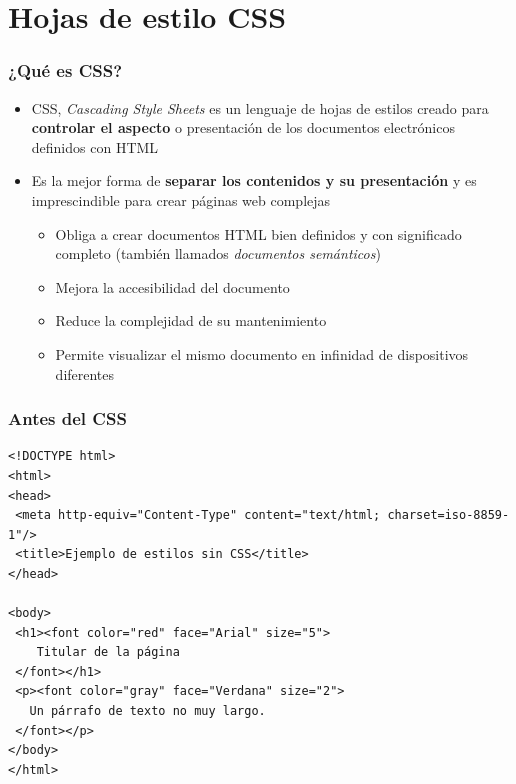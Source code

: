 \documentclass[ucs]{beamer}
\begin{document}




\section{Hojas de estilo CSS}



\begin{frame}
\frametitle{¿Qué es CSS?}

\begin{itemize}
  \item CSS, \emph{Cascading Style Sheets} es un lenguaje de hojas de estilos creado para {\bf controlar el aspecto} o presentación de los documentos electrónicos definidos con HTML
  \item Es la mejor forma de {\bf separar los contenidos y su presentación} y es imprescindible para crear páginas web complejas
  \begin{itemize}
    \item Obliga a crear documentos HTML bien definidos y con significado completo (también llamados \emph{documentos semánticos})
    \item Mejora la accesibilidad del documento
    \item Reduce la complejidad de su mantenimiento
    \item Permite visualizar el mismo documento en infinidad de dispositivos diferentes
  \end{itemize}
\end{itemize}

\end{frame}


\begin{frame}[fragile]
\frametitle{Antes del CSS}

{\footnotesize
\begin{verbatim}
<!DOCTYPE html>
<html>
<head>
 <meta http-equiv="Content-Type" content="text/html; charset=iso-8859-1"/>
 <title>Ejemplo de estilos sin CSS</title>
</head>
 
<body>
 <h1><font color="red" face="Arial" size="5">
    Titular de la página
 </font></h1>
 <p><font color="gray" face="Verdana" size="2">
   Un párrafo de texto no muy largo.
 </font></p>
</body>
</html>
\end{verbatim}
}

\end{frame}
\end{document}
